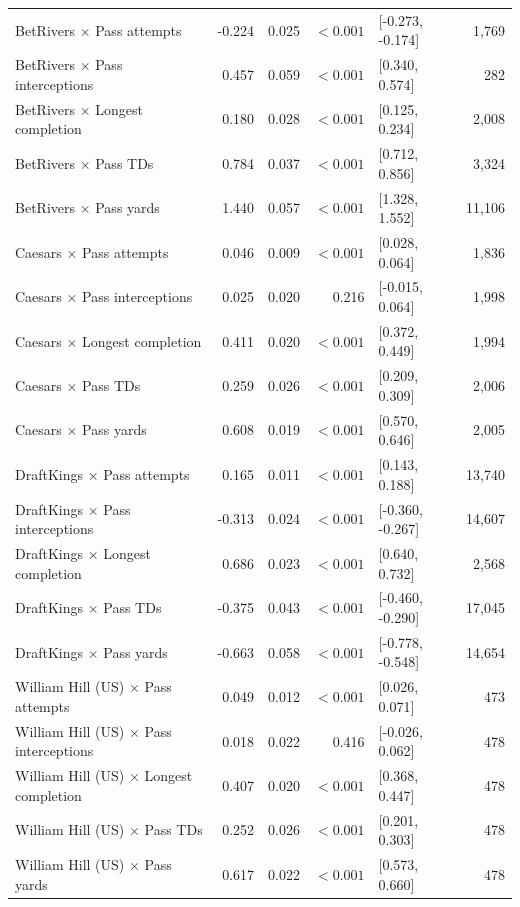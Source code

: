 \begin{table}[H]
\begin{tabular}{lrrrlr}
BetRivers $\times$ Pass attempts & -0.224 & 0.025 & $<0.001$ & [-0.273, -0.174] & 1,769 \\
BetRivers $\times$ Pass interceptions & 0.457 & 0.059 & $<0.001$ & [0.340, 0.574] & 282 \\
BetRivers $\times$ Longest completion & 0.180 & 0.028 & $<0.001$ & [0.125, 0.234] & 2,008 \\
BetRivers $\times$ Pass TDs & 0.784 & 0.037 & $<0.001$ & [0.712, 0.856] & 3,324 \\
BetRivers $\times$ Pass yards & 1.440 & 0.057 & $<0.001$ & [1.328, 1.552] & 11,106 \\
Caesars $\times$ Pass attempts & 0.046 & 0.009 & $<0.001$ & [0.028, 0.064] & 1,836 \\
Caesars $\times$ Pass interceptions & 0.025 & 0.020 & 0.216 & [-0.015, 0.064] & 1,998 \\
Caesars $\times$ Longest completion & 0.411 & 0.020 & $<0.001$ & [0.372, 0.449] & 1,994 \\
Caesars $\times$ Pass TDs & 0.259 & 0.026 & $<0.001$ & [0.209, 0.309] & 2,006 \\
Caesars $\times$ Pass yards & 0.608 & 0.019 & $<0.001$ & [0.570, 0.646] & 2,005 \\
DraftKings $\times$ Pass attempts & 0.165 & 0.011 & $<0.001$ & [0.143, 0.188] & 13,740 \\
DraftKings $\times$ Pass interceptions & -0.313 & 0.024 & $<0.001$ & [-0.360, -0.267] & 14,607 \\
DraftKings $\times$ Longest completion & 0.686 & 0.023 & $<0.001$ & [0.640, 0.732] & 2,568 \\
DraftKings $\times$ Pass TDs & -0.375 & 0.043 & $<0.001$ & [-0.460, -0.290] & 17,045 \\
DraftKings $\times$ Pass yards & -0.663 & 0.058 & $<0.001$ & [-0.778, -0.548] & 14,654 \\
William Hill (US) $\times$ Pass attempts & 0.049 & 0.012 & $<0.001$ & [0.026, 0.071] & 473 \\
William Hill (US) $\times$ Pass interceptions & 0.018 & 0.022 & 0.416 & [-0.026, 0.062] & 478 \\
William Hill (US) $\times$ Longest completion & 0.407 & 0.020 & $<0.001$ & [0.368, 0.447] & 478 \\
William Hill (US) $\times$ Pass TDs & 0.252 & 0.026 & $<0.001$ & [0.201, 0.303] & 478 \\
William Hill (US) $\times$ Pass yards & 0.617 & 0.022 & $<0.001$ & [0.573, 0.660] & 478 \\

\end{tabular}
\end{table}
